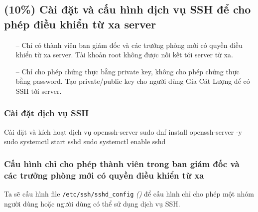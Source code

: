 \subsection{(10\%) Cài đặt và cấu hình dịch vụ SSH để cho phép điều khiển từ xa server}


\begin{itemize}
  \item [--] Chỉ có thành viên ban giám đốc và các trưởng phòng mới có quyền điều khiển từ xa server. Tài khoản root không được nối kết tới server từ xa.
  \item [--] Chỉ cho phép chứng thực bằng private key, không cho phép chứng thực bằng password. Tạo private/public key cho người dùng Gia Cát Lượng để có SSH tới server.
\end{itemize}

\subsubsection{Cài đặt dịch vụ SSH}


\vspace{0.5cm}
\begin{bashlisting}{Cài đặt và kích hoạt dịch vụ openssh-server}
  sudo dnf install openssh-server -y
  sudo systemctl start sshd
  sudo systemctl enable sshd
\end{bashlisting}

\subsubsection{Cấu hình chỉ cho phép thành viên trong ban giám đốc và các trưởng phòng mới có quyền điều khiển từ xa}

Ta sẽ cấu hình file \texttt{/etc/ssh/sshd\_config} \textit{()} để cấu hình chỉ cho phép một nhóm người dùng hoặc người dùng có thể sử dụng dịch vụ SSH.

